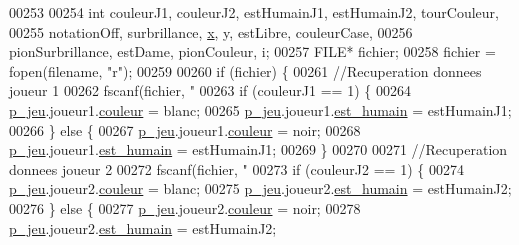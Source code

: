 \begin{DoxyCode}
{{{{{{{00253 
00254         \textcolor{keywordtype}{int} couleurJ1, couleurJ2, estHumainJ1, estHumainJ2, tourCouleur,
00255                         notationOff, surbrillance, \hyperlink{plateau_8h_a9e00f85b4b6ec2d8bdfbe94ff40f0eeeacab1e15e82c5976bfb476ddfe145263c}{x}, y, estLibre, couleurCase,
00256                         pionSurbrillance, estDame, pionCouleur, i;
00257         FILE* fichier;
00258         fichier = fopen(filename, \textcolor{stringliteral}{"r"});
00259 
00260         \textcolor{keywordflow}{if} (fichier) \{
00261                 \textcolor{comment}{//Recuperation donnees joueur 1}
00262                 fscanf(fichier, \textcolor{stringliteral}{"%
00263                 \textcolor{keywordflow}{if} (couleurJ1 == 1) \{
00264                         \hyperlink{moteur_8h_a3efa8d0f7c65daedc584dc8db048e62c}{p_jeu}.joueur1.\hyperlink{structjoueur_a057f95a41503a890f27c651969ffac8d}{couleur} = blanc;
00265                         \hyperlink{moteur_8h_a3efa8d0f7c65daedc584dc8db048e62c}{p_jeu}.joueur1.\hyperlink{structjoueur_a9419778626112832ee0e59df49145a39}{est_humain} = estHumainJ1;
00266                 \} \textcolor{keywordflow}{else} \{
00267                         \hyperlink{moteur_8h_a3efa8d0f7c65daedc584dc8db048e62c}{p_jeu}.joueur1.\hyperlink{structjoueur_a057f95a41503a890f27c651969ffac8d}{couleur} = noir;
00268                         \hyperlink{moteur_8h_a3efa8d0f7c65daedc584dc8db048e62c}{p_jeu}.joueur1.\hyperlink{structjoueur_a9419778626112832ee0e59df49145a39}{est_humain} = estHumainJ1;
00269                 \}
00270 
00271                 \textcolor{comment}{//Recuperation donnees joueur 2}
00272                 fscanf(fichier, \textcolor{stringliteral}{"%
00273                 \textcolor{keywordflow}{if} (couleurJ2 == 1) \{
00274                         \hyperlink{moteur_8h_a3efa8d0f7c65daedc584dc8db048e62c}{p_jeu}.joueur2.\hyperlink{structjoueur_a057f95a41503a890f27c651969ffac8d}{couleur} = blanc;
00275                         \hyperlink{moteur_8h_a3efa8d0f7c65daedc584dc8db048e62c}{p_jeu}.joueur2.\hyperlink{structjoueur_a9419778626112832ee0e59df49145a39}{est_humain} = estHumainJ2;
00276                 \} \textcolor{keywordflow}{else} \{
00277                         \hyperlink{moteur_8h_a3efa8d0f7c65daedc584dc8db048e62c}{p_jeu}.joueur2.\hyperlink{structjoueur_a057f95a41503a890f27c651969ffac8d}{couleur} = noir;
00278                         \hyperlink{moteur_8h_a3efa8d0f7c65daedc584dc8db048e62c}{p_jeu}.joueur2.\hyperlink{structjoueur_a9419778626112832ee0e59df49145a39}{est_humain} = estHumainJ2;
}}}}}}}}}
\end{DoxyCode}
